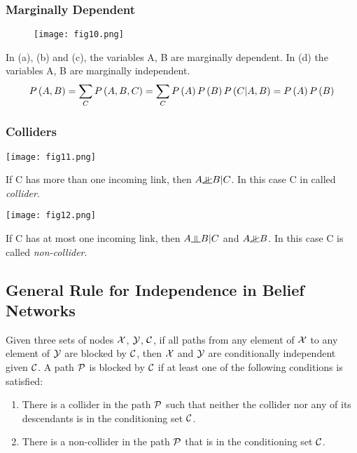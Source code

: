\subsubsection*{Marginally Dependent}

\begin{figure*}[h]
	\centering
	\texttt{[image: fig10.png]}
\end{figure*}
In (a), (b) and (c), the variables A, B are marginally dependent.
In (d) the variables A, B are marginally independent.
\begin{align*}
\P{A,B}=\sum_C\P{A,B,C}=\sum_C\P{A}\P{B}\P{C|A,B}=\P{A}\P{B}
\end{align*}

\subsubsection*{Colliders}

\begin{minipage}{0.4\textwidth}
	\centering
	\texttt{[image: fig11.png]}
\end{minipage}
\begin{minipage}{0.6\textwidth}
	If C has more than one incoming link, then $A\nindep B|C$. In this case C in called \textit{collider}.
\end{minipage}
\begin{minipage}{0.4\textwidth}
	\centering
	\texttt{[image: fig12.png]}
\end{minipage}
\begin{minipage}{0.6\textwidth}
	If C has at most one incoming link, then $A\indep B|C$ and $A\nindep B$. In this case C is called \textit{non-collider}.
\end{minipage}

\subsection{General Rule for Independence in Belief Networks}

Given three sets of nodes $\cX$, $\cY$, $\cC$, if all paths from any element of $\cX$ to any element of $\cY$ are blocked by $\cC$, then $\cX$ and $\cY$ are conditionally independent given $\cC$.
A path $\cP$ is blocked by $\cC$ if at least one of the following conditions is satisfied:
\begin{enumerate}
	\item There is a collider in the path $\cP$ such that neither the collider nor any of its descendants is in the conditioning set $\cC$.
	\item There is a non-collider in the path $\cP$ that is in the conditioning set $\cC$.
\end{enumerate}

